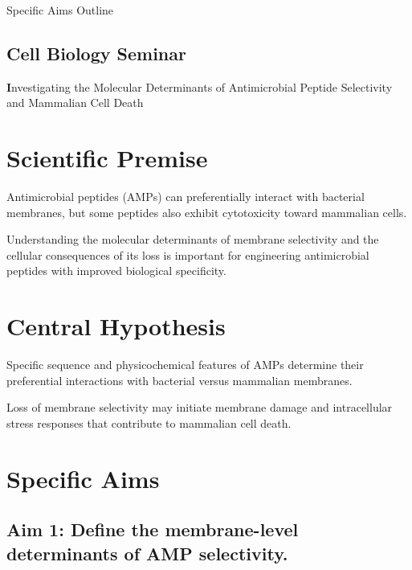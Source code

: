 \documentclass[11pt]{article}
\begin{document}
    
\begin{center}
    
\title{\Large}{Specific Aims Outline}

\subsection*{Cell Biology Seminar}

\author{Nur Ceren Kabakci}

\date{\today}

\end{center}



\begin{center}

{\Large \textbf Investigating the Molecular Determinants of
    Antimicrobial Peptide Selectivity and
    Mammalian Cell Death}

\end{center}


\section*{Scientific Premise}
Antimicrobial peptides (AMPs) can preferentially interact
with bacterial membranes, but some peptides also exhibit
cytotoxicity toward mammalian cells.

Understanding the molecular determinants of membrane
selectivity and the cellular consequences of its loss
is important for engineering antimicrobial peptides
with improved biological specificity.

\section*{Central Hypothesis}
Specific sequence and physicochemical features of AMPs
determine their preferential interactions with bacterial
versus mammalian membranes.

Loss of membrane selectivity may initiate membrane damage
and intracellular stress responses that contribute to
mammalian cell death.

\section*{Specific Aims}

\subsection*{Aim 1: Define the membrane-level determinants
of AMP selectivity.}
\end{document}
